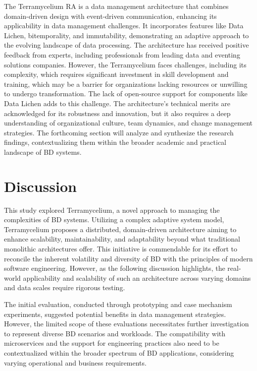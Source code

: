 \documentclass[review]{elsarticle}
\begin{document}
The Terramycelium RA is a data management architecture that combines domain-driven design with event-driven communication, enhancing its applicability in data management challenges. It incorporates features like Data Lichen, bitemporality, and immutability, demonstrating an adaptive approach to the evolving landscape of data processing. The architecture has received positive feedback from experts, including professionals from leading data and eventing solutions companies. However, the Terramycelium faces challenges, including its complexity, which requires significant investment in skill development and training, which may be a barrier for organizations lacking resources or unwilling to undergo transformation. The lack of open-source support for components like Data Lichen adds to this challenge. The architecture's technical merits are acknowledged for its robustness and innovation, but it also requires a deep understanding of organizational culture, team dynamics, and change management strategies. The forthcoming section will analyze and synthesize the research findings, contextualizing them within the broader academic and practical landscape of BD systems.

\section{Discussion} \label{sec:discussion}

This study explored Terramycelium, a novel approach to managing the complexities of BD systems. Utilizing a complex adaptive system model, Terramycelium proposes a distributed, domain-driven architecture aiming to enhance scalability, maintainability, and adaptability beyond what traditional monolithic architectures offer. This initiative is commendable for its effort to reconcile the inherent volatility and diversity of BD with the principles of modern software engineering. However, as the following discussion highlights, the real-world applicability and scalability of such an architecture across varying domains and data scales require rigorous testing.

The initial evaluation, conducted through prototyping and case mechanism experiments, suggested potential benefits in data management strategies. However, the limited scope of these evaluations necessitates further investigation to represent diverse BD scenarios and workloads. The compatibility with microservices and the support for engineering practices also need to be contextualized within the broader spectrum of BD applications, considering varying operational and business requirements.
\end{document}
